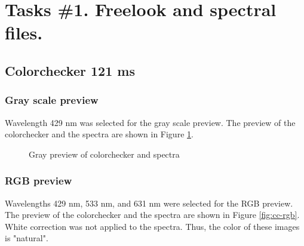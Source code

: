 \section{Tasks \#1. Freelook and spectral files.}

\subsection{Colorchecker 121 ms}

\subsubsection{Gray scale preview}
Wavelength 429 nm was selected for the gray scale preview. The
preview of the colorchecker and the spectra are shown in Figure
\ref{fig:cc-gray}.

\begin{figure}[H] %
  \centering
  \hspace{0.1cm}
  \caption[]{Gray preview of colorchecker and spectra }
  \label{fig:cc-gray}
\end{figure}

\subsubsection{RGB preview}
Wavelengths 429 nm, 533 nm, and 631 nm were selected for the RGB
preview. The preview of the colorchecker and the spectra are shown in
Figure \ref{fig:cc-rgb}. White correction was not applied to the
spectra. Thus, the color of these images is "natural".

